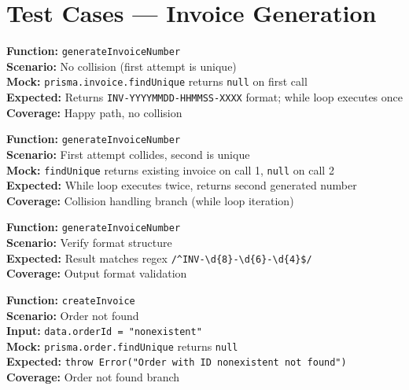 \documentclass[12pt,a4paper]{report}
\newcommand{\pone}{\textbf{\color{p1red}P1}}
\newcommand{\ptwo}{\textbf{\color{p2orange}P2}}
\begin{document}
\section{Test Cases --- Invoice Generation}

\begin{tcolorbox}[testbox, title={INV-001 \hfill \ptwo}]
\textbf{Function:} \texttt{generateInvoiceNumber} \\
\textbf{Scenario:} No collision (first attempt is unique) \\
\textbf{Mock:} \texttt{prisma.invoice.findUnique} returns \texttt{null} on first call \\
\textbf{Expected:} Returns \texttt{INV-YYYYMMDD-HHMMSS-XXXX} format; while loop executes once \\
\textbf{Coverage:} Happy path, no collision
\end{tcolorbox}

\begin{tcolorbox}[testbox, title={INV-002 \hfill \ptwo}]
\textbf{Function:} \texttt{generateInvoiceNumber} \\
\textbf{Scenario:} First attempt collides, second is unique \\
\textbf{Mock:} \texttt{findUnique} returns existing invoice on call 1, \texttt{null} on call 2 \\
\textbf{Expected:} While loop executes twice, returns second generated number \\
\textbf{Coverage:} Collision handling branch (while loop iteration)
\end{tcolorbox}

\begin{tcolorbox}[testbox, title={INV-003 \hfill \ptwo}]
\textbf{Function:} \texttt{generateInvoiceNumber} \\
\textbf{Scenario:} Verify format structure \\
\textbf{Expected:} Result matches regex \texttt{/\^{}INV-\textbackslash d\{8\}-\textbackslash d\{6\}-\textbackslash d\{4\}\$/} \\
\textbf{Coverage:} Output format validation
\end{tcolorbox}

\begin{tcolorbox}[criticalbox, title={INV-004 \hfill \pone\ --- Order Not Found}]
\textbf{Function:} \texttt{createInvoice} \\
\textbf{Scenario:} Order not found \\
\textbf{Input:} \texttt{data.orderId = "nonexistent"} \\
\textbf{Mock:} \texttt{prisma.order.findUnique} returns \texttt{null} \\
\textbf{Expected:} \texttt{throw Error("Order with ID nonexistent not found")} \\
\textbf{Coverage:} Order not found branch
\end{tcolorbox}
\end{document}
